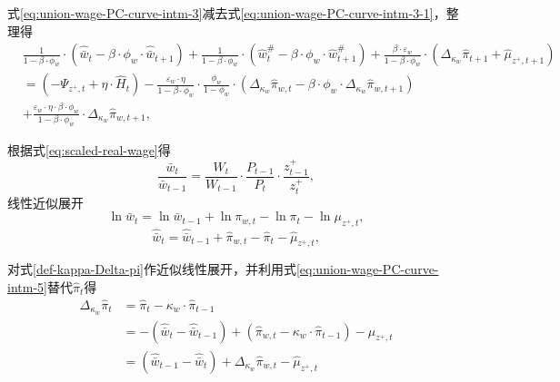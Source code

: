式\eqref{eq:union-wage-PC-curve-intm-3}减去式\eqref{eq:union-wage-PC-curve-intm-3-1}，整理得
\begin{equation}
\label{eq:union-wage-PC-curve-intm-4}
\begin{split}
&\frac{1}{1-\beta \cdot \phi_w} \cdot \left(\hat{\bar{w}}_{t} - \beta \cdot \phi_w \cdot \hat{\bar{w}}_{t+1}\right)
+ \frac{1}{1-\beta \cdot \phi_w} \cdot \left( \hat{w}^{\#}_{t} - \beta \cdot \phi_w \cdot \hat{w}^{\#}_{t+1} \right)
+ \frac{\beta \cdot \varepsilon_w }{1-\beta \cdot \phi_w} \cdot  \left( \Delta_{\kappa_w} \hat{\pi}_{t+1} + \hat{\mu}_{z^+,t+1} \right) \\
&= \left( -\Psi_{z^+,t} + \eta \cdot \hat{H}_t \right)
- \frac{\varepsilon_w \cdot \eta}{1-\beta \cdot \phi_w} \cdot
  \frac{\phi_w}{1-\phi_w} \cdot \left(\Delta_{\kappa_w} \hat{\pi}_{w,t} - \beta \cdot \phi_w \cdot \Delta_{\kappa_w} \hat{\pi}_{w,t+1}\right) \\
&+ \frac{\varepsilon_w \cdot \eta \cdot \beta \cdot \phi_w }{1-\beta \cdot \phi_w} \cdot \Delta_{\kappa_w}\hat{\pi}_{w,t+1},
\end{split}
\end{equation}

根据式\eqref{eq:scaled-real-wage}得
\begin{equation*}
  \frac{\bar{w}_t}{\bar{w}_{t-1}} = \frac{W_t}{W_{t-1}} \cdot \frac{P_{t-1}}{P_t}\cdot \frac{z^+_{t-1}}{z^+_{t}},
\end{equation*}
线性近似展开
\begin{equation*}
\ln \bar{w}_t = \ln \bar{w}_{t-1} + \ln \pi_{w,t} - \ln \pi_t - \ln \mu_{z^+,t},
\end{equation*}
\begin{equation}
\label{eq:union-wage-PC-curve-intm-5}
\hat{\bar{w}}_t = \hat{\bar{w}}_{t-1} + \hat{\pi}_{w,t} - \hat{\pi}_t - \hat{\mu}_{z^+,t},
\end{equation}

对式\eqref{def-kappa-Delta-pi}作近似线性展开，并利用式\eqref{eq:union-wage-PC-curve-intm-5}替代$\hat{\pi}_t$得
\begin{align}
\label{eq:union-wage-PC-curve-intm-6}
\Delta_{\kappa_w} \hat{\pi}_t &= \hat{\pi}_{t} - \kappa_w \cdot \hat{\pi}_{t-1} \nonumber \\
&= -\left(\hat{\bar{w}}_t - \hat{\bar{w}}_{t-1}\right) + \left(\hat{\pi}_{w,t} - \kappa_w \cdot \hat{\pi}_{t-1}\right) - \hat{\mu}_{z^+,t} \nonumber \\
&=\left(\hat{\bar{w}}_{t-1} - \hat{\bar{w}}_{t}\right) + \Delta_{\kappa_w} \hat{\pi}_{w,t} - \hat{\mu}_{z^+,t}
\end{align}

